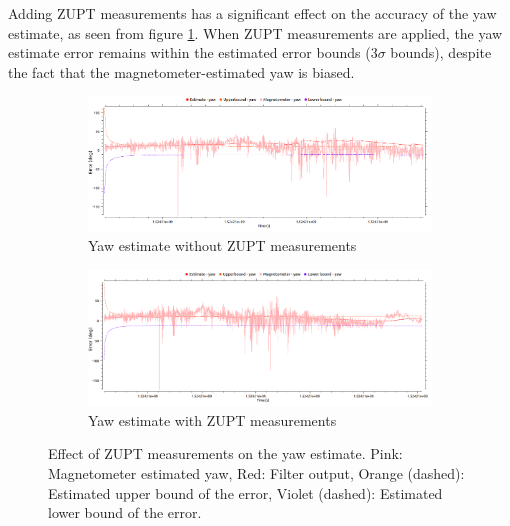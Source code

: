 Adding \gls{ZUPT} measurements has a significant effect on the accuracy of the yaw estimate, as seen from figure \ref{fig:pa:zuptYaw}. When \gls{ZUPT} measurements are applied, the yaw estimate error remains within the estimated error bounds (3$\sigma$ bounds), despite the fact that the magnetometer-estimated yaw is biased.
\begin{figure}[h]
	\centering
    \begin{subfigure}{\textwidth}
        \includegraphics[width=\textwidth]{figs/yaw-without-zupt.png}
        \caption{Yaw estimate without \gls{ZUPT} measurements}
    \end{subfigure}
    \begin{subfigure}{\textwidth}
        \includegraphics[width=\textwidth]{figs/yaw-with-zupt.png}
        \caption{Yaw estimate with \gls{ZUPT} measurements}
    \end{subfigure}
    \vspace{-0.5cm}
    \caption[Effect of \gls{ZUPT} measurements on the yaw estimate]{Effect of \gls{ZUPT} measurements on the yaw estimate. Pink: Magnetometer estimated yaw, Red: Filter output, Orange (dashed): Estimated upper bound of the error, Violet (dashed): Estimated lower bound of the error.}
    \label{fig:pa:zuptYaw}
    \vspace{0.5cm}
\end{figure}









